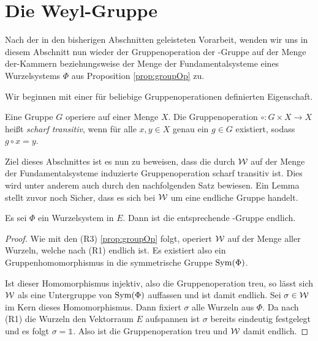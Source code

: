 \section{Die Weyl-Gruppe}
\label{sec:weylgroup}

Nach der in den bisherigen Abschnitten geleisteten Vorarbeit, wenden wir uns in diesem Abschnitt nun wieder der Gruppenoperation der \weyl\hyp{}Gruppe auf der Menge der\weyl\hyp{}Kammern beziehungsweise der Menge der Fundamentalsysteme eines Wurzelsystems $\Phi$ aus Proposition \ref{prop:groupOp} zu.

Wir beginnen mit einer für beliebige Gruppenoperationen definierten Eigenschaft.

\begin{defn}
  Eine Gruppe $G$ operiere auf einer Menge $X$.
  Die Gruppenoperation $\circ \colon G \times X \to X$ heißt \emph{scharf transitiv}, wenn für alle $x,y \in X$ genau ein $g \in G$ existiert, sodass $g \circ x = y$. 
\end{defn}

Ziel dieses Abschnittes ist es nun zu beweisen, dass die durch $\mathcal{W}$ auf der Menge der Fundamentalsysteme induzierte Gruppenoperation scharf transitiv ist.
Dies wird unter anderem auch durch den nachfolgenden Satz bewiesen.
Ein Lemma stellt zuvor noch Sicher, dass es sich bei $\mathcal{W}$ um eine endliche Gruppe handelt.

\begin{lem}
  \label{lem:weylFinite}
  Es sei $\Phi$ ein Wurzelsystem in $E$. Dann ist die entsprechende \weyl\hyp{}Gruppe endlich. 
\end{lem}

\begin{proof}
  Wie mit den (R3) \ref{prop:groupOp} folgt, operiert $\mathcal{W}$ auf der Menge aller Wurzeln, welche nach (R1) endlich ist.
  Es existiert also ein Gruppenhomomorphismus in die symmetrische Gruppe $\operatorname{Sym}(\Phi)$.

  Ist dieser Homomorphismus injektiv, also die Gruppenoperation treu, so lässt sich $\mathcal{W}$ als eine Untergruppe von $\operatorname{Sym}(\Phi)$ auffassen und ist damit endlich.
  Sei $\sigma \in \mathcal{W}$ im Kern dieses Homomorphismus.
  Dann fixiert $\sigma$ alle Wurzeln aus $\Phi$.
  Da nach (R1) die Wurzeln den Vektorraum $E$ aufspannen ist $\sigma$ bereits eindeutig festgelegt und es folgt $\sigma = \mathds{1}$.
  Also ist die Gruppenoperation treu und $\mathcal{W}$ damit endlich.
\end{proof}


